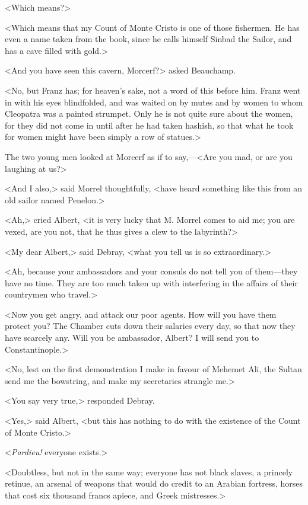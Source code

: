  <Which means?> 

 <Which means that my Count of Monte Cristo is one of those fishermen. He has even a name taken from the book, since he calls himself Sinbad the Sailor, and has a cave filled with gold.> 

 <And you have seen this cavern, Morcerf?> asked Beauchamp. 

 <No, but Franz has; for heaven's sake, not a word of this before him. Franz went in with his eyes blindfolded, and was waited on by mutes and by women to whom Cleopatra was a painted strumpet. Only he is not quite sure about the women, for they did not come in until after he had taken hashish, so that what he took for women might have been simply a row of statues.> 

 The two young men looked at Morcerf as if to say,—<Are you mad, or are you laughing at us?> 

 <And I also,> said Morrel thoughtfully, <have heard something like this from an old sailor named Penelon.> 

 <Ah,> cried Albert, <it is very lucky that M. Morrel comes to aid me; you are vexed, are you not, that he thus gives a clew to the labyrinth?> 

 <My dear Albert,> said Debray, <what you tell us is so extraordinary.> 

 <Ah, because your ambassadors and your consuls do not tell you of them—they have no time. They are too much taken up with interfering in the affairs of their countrymen who travel.> 

 <Now you get angry, and attack our poor agents. How will you have them protect you? The Chamber cuts down their salaries every day, so that now they have scarcely any. Will you be ambassador, Albert? I will send you to Constantinople.> 

 <No, lest on the first demonstration I make in favour of Mehemet Ali, the Sultan send me the bowstring, and make my secretaries strangle me.> 

 <You say very true,> responded Debray. 

 <Yes,> said Albert, <but this has nothing to do with the existence of the Count of Monte Cristo.> 

 <\textit{Pardieu!} everyone exists.> 

 <Doubtless, but not in the same way; everyone has not black slaves, a princely retinue, an arsenal of weapons that would do credit to an Arabian fortress, horses that cost six thousand francs apiece, and Greek mistresses.> 

